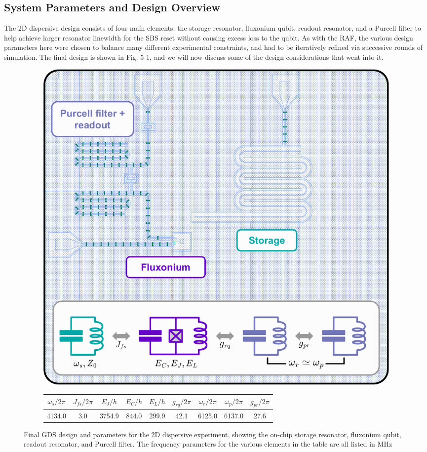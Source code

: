 \subsection{System Parameters and Design Overview}
The 2D dispersive design consists of four main elements: the storage resonator, fluxonium qubit, readout resonator, and a Purcell filter to help achieve larger resonator linewidth for the SBS reset without causing excess loss to the qubit. As with the RAF, the various design parameters here were chosen to balance many different experimental constraints, and had to be iteratively refined via successive rounds of simulation. The final design is shown in Fig. 5-1, and we will now discuss some of the design considerations that went into it.
\begin{figure}[h] 
    \begin{subfigure}{\linewidth}
        \centering
        \includegraphics[width=0.8\linewidth]{Figures/5/2D_Dispersive_GDS.pdf}
        \vspace*{2mm}
    \end{subfigure} 
    \begin{subfigure}{\linewidth}
        \centering
        \begin{tabular}{c|c|c|c|c|c|c|c|c }
       $\omega_s/2\pi$ & $J_{fs}/2\pi$ & $E_J/h$  & $E_C/h$ & $E_L/h$ & $g_{rq}/2\pi$ & $\omega_r/2\pi$ & $\omega_p/2\pi$ & $g_{pr}/2\pi$\\\hline
        4134.0 & 3.0 & 3754.9 & 844.0 & 299.9 & 42.1 & 6125.0 & 6137.0 & 27.6
    \end{tabular}
    \end{subfigure}
    \caption{Final GDS design and parameters for the 2D dispersive experiment, showing the on-chip storage resonator, fluxonium qubit, readout resonator, and Purcell filter. The frequency parameters for the various elements in the table are all listed in MHz}
    \label{fig:5_2D_Dispersive_GDS}
\end{figure}

